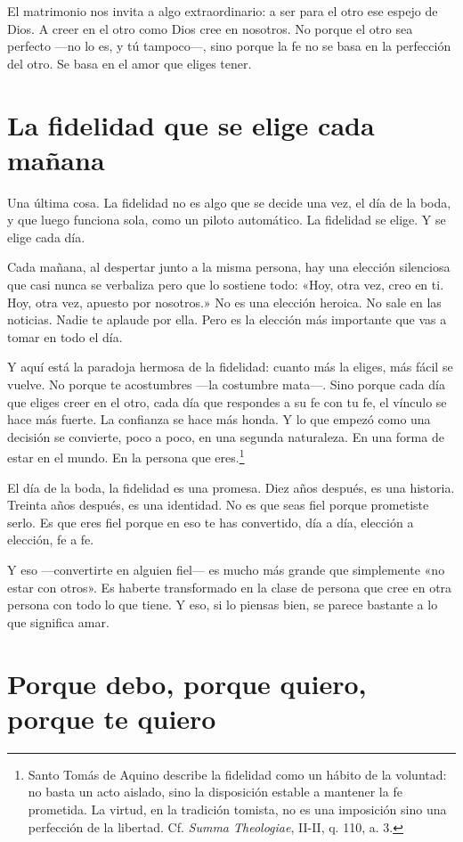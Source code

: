 El matrimonio nos invita a algo extraordinario: a ser para el otro ese espejo de Dios. A creer en el otro como Dios cree en nosotros. No porque el otro sea perfecto ---no lo es, y tú tampoco---, sino porque la fe no se basa en la perfección del otro. Se basa en el amor que eliges tener.

\section{La fidelidad que se elige cada mañana}

Una última cosa. La fidelidad no es algo que se decide una vez, el día de la boda, y que luego funciona sola, como un piloto automático. La fidelidad se elige. Y se elige cada día.

Cada mañana, al despertar junto a la misma persona, hay una elección silenciosa que casi nunca se verbaliza pero que lo sostiene todo: «Hoy, otra vez, creo en ti. Hoy, otra vez, apuesto por nosotros.» No es una elección heroica. No sale en las noticias. Nadie te aplaude por ella. Pero es la elección más importante que vas a tomar en todo el día.

Y aquí está la paradoja hermosa de la fidelidad: cuanto más la eliges, más fácil se vuelve. No porque te acostumbres ---la costumbre mata---. Sino porque cada día que eliges creer en el otro, cada día que respondes a su fe con tu fe, el vínculo se hace más fuerte. La confianza se hace más honda. Y lo que empezó como una decisión se convierte, poco a poco, en una segunda naturaleza. En una forma de estar en el mundo. En la persona que eres.\footnote{Santo Tomás de Aquino describe la fidelidad como un hábito de la voluntad: no basta un acto aislado, sino la disposición estable a mantener la fe prometida. La virtud, en la tradición tomista, no es una imposición sino una perfección de la libertad. Cf. \textit{Summa Theologiae}, II-II, q. 110, a. 3.}

El día de la boda, la fidelidad es una promesa. Diez años después, es una historia. Treinta años después, es una identidad. No es que seas fiel porque prometiste serlo. Es que eres fiel porque en eso te has convertido, día a día, elección a elección, fe a fe.

Y eso ---convertirte en alguien fiel--- es mucho más grande que simplemente «no estar con otros». Es haberte transformado en la clase de persona que cree en otra persona con todo lo que tiene. Y eso, si lo piensas bien, se parece bastante a lo que significa amar.

\section{Porque debo, porque quiero, porque te quiero}

